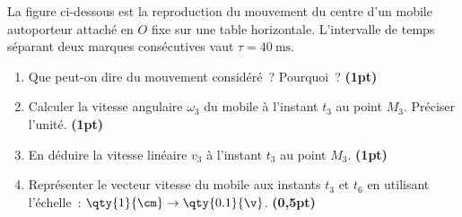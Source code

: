 \begin{minipage}{0.66\linewidth}
    La figure ci-dessous est la reproduction du mouvement du centre d'un mobile
    autoporteur attaché en $O$ fixe sur une table horizontale. L'intervalle de
    temps séparant deux marques consécutives vaut $\tau=\qty{40}{\ms}$.
    
    \begin{enumerate}
        \item Que peut-on dire du mouvement considéré~? Pourquoi~?
              \textbf{(1pt)}
        \item Calculer la vitesse angulaire $\omega_{3}$ du mobile à l'instant
              $t_{3}$ au point $M_{3}$. Préciser l'unité.
              \textbf{(1pt)}
        \item En déduire la vitesse linéaire $v_{3}$ à l'instant $t_{3}$ au point
              $M_{3}$.
              \textbf{(1pt)}
        \item Représenter le vecteur vitesse du mobile aux instants $t_{3}$ et
              $t_{6}$ en utilisant l'échelle~:
              $\qty{1}{\cm} \to \qty{0.1}{\v}$.
              \textbf{(0,5pt)}
    \end{enumerate}
\end{minipage}
\hfill
\begin{minipage}{0.33\linewidth}
    \flushright
\end{minipage}
